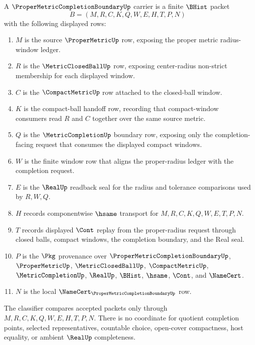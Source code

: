 \begin{definition}
\label{def:proper-metric-completion-boundary-carrier}
A $\ProperMetricCompletionBoundaryUp$ carrier is a finite $\BHist$ packet
$$
B=(M,R,C,K,Q,W,E,H,T,P,N)
$$
with the following displayed rows:
\begin{enumerate}
\item $M$ is the source $\ProperMetricUp$ row, exposing the proper metric radius-window ledger.
\item $R$ is the $\MetricClosedBallUp$ row, exposing center-radius non-strict membership for each displayed window.
\item $C$ is the $\CompactMetricUp$ row attached to the closed-ball window.
\item $K$ is the compact-ball handoff row, recording that compact-window consumers read $R$ and $C$ together over the same source metric.
\item $Q$ is the $\MetricCompletionUp$ boundary row, exposing only the completion-facing request that consumes the displayed compact windows.
\item $W$ is the finite window row that aligns the proper-radius ledger with the completion request.
\item $E$ is the $\RealUp$ readback seal for the radius and tolerance comparisons used by $R,W,Q$.
\item $H$ records componentwise $\hsame$ transport for $M,R,C,K,Q,W,E,T,P,N$.
\item $T$ records displayed $\Cont$ replay from the proper-radius request through closed balls, compact windows, the completion boundary, and the Real seal.
\item $P$ is the $\Pkg$ provenance over $\ProperMetricCompletionBoundaryUp$, $\ProperMetricUp$, $\MetricClosedBallUp$, $\CompactMetricUp$, $\MetricCompletionUp$, $\RealUp$, $\BHist$, $\hsame$, $\Cont$, and $\NameCert$.
\item $N$ is the local $\NameCert_{\ProperMetricCompletionBoundaryUp}$ row.
\end{enumerate}
The classifier compares accepted packets only through $M,R,C,K,Q,W,E,H,T,P,N$. There is no coordinate for quotient completion points, selected representatives, countable choice, open-cover compactness, host equality, or ambient $\RealUp$ completeness.
\end{definition}

